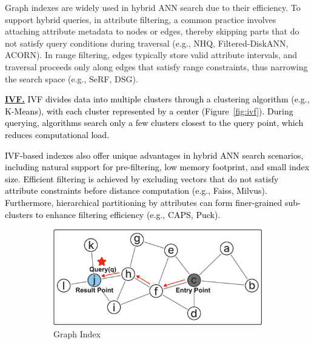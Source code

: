 \documentclass[sigconf, nonacm, pdfa]{acmart}
\begin{document}
{Graph indexes are widely used in hybrid ANN search due to their efficiency. To support hybrid queries, in attribute filtering, a common practice involves attaching attribute metadata to nodes or edges, thereby skipping parts that do not satisfy query conditions during traversal (e.g., NHQ, Filtered-DiskANN, ACORN). In range filtering, edges typically store valid attribute intervals, and traversal proceeds only along edges that satisfy range constraints, thus narrowing the search space (e.g., SeRF, DSG).
	

	
	
	\noindent\textbf{\underline{IVF.}} 
	\textcolor{black}{IVF divides data into multiple clusters through a clustering algorithm (e.g., K-Means), with each cluster represented by a center (Figure~\ref{fig:ivf}). During querying, algorithms search only a few clusters closest to the query point, which reduces computational load.}
	
	\textcolor{black}{IVF-based indexes also offer unique advantages in hybrid ANN search scenarios, including natural support for pre-filtering, low memory footprint, and small index size. Efficient filtering is achieved by excluding vectors that do not satisfy attribute constraints before distance computation (e.g., Faiss, Milvus). Furthermore, hierarchical partitioning by attributes can form finer-grained sub-clusters to enhance filtering efficiency (e.g., CAPS, Puck).}


	
	\begin{figure}
		\begin{subfigure}{0.60\columnwidth}
			\centering
			
			\includegraphics[width=\linewidth]{figures/graph.pdf}
			\caption{Graph Index}
			\label{fig:graph}
		\end{subfigure}
		\hfill
		\begin{subfigure}{0.38\columnwidth}
			\centering
			

\end{subfigure}
\end{figure}}
\end{document}
